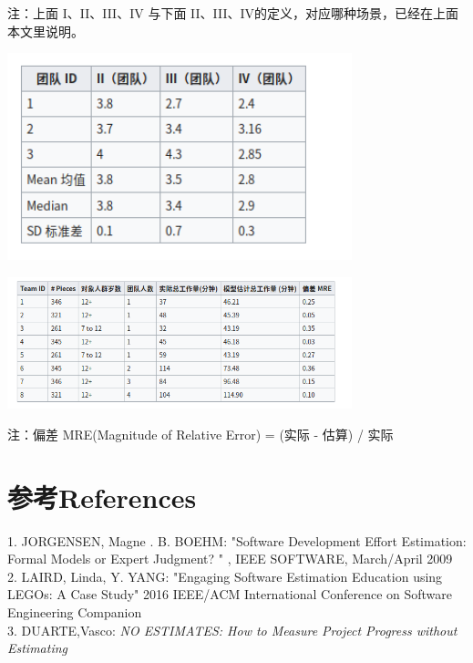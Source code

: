注：上面 I、II、III、IV 与下面 II、III、IV的定义，对应哪种场景，已经在上面本文里说明。


\includegraphics[width=10cm]{Screenshotfrom2023-11-1222-01-34.png}

\includegraphics[width=10cm]{Screenshotfrom2023-11-1222-02-23.png}



注：偏差 MRE(Magnitude of Relative Error) = \textbar{} (实际 - 估算)
\textbar{} / 实际

\hypertarget{references}{%
\section{参考References}\label{references}}

1. JORGENSEN, Magne . B. BOEHM: "Software Development Effort Estimation:
Formal Models or Expert Judgment? " , IEEE SOFTWARE, March/April 2009\\
2. LAIRD, Linda, Y. YANG: "Engaging Software Estimation Education using
LEGOs: A Case Study" 2016 IEEE/ACM International Conference on Software
Engineering Companion\\
3. DUARTE,Vasco: \emph{NO ESTIMATES: How to Measure Project Progress
without Estimating}\\



